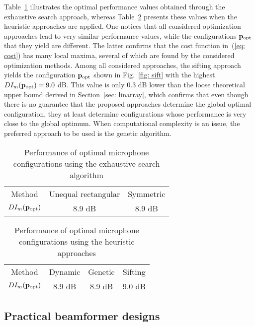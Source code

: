 \documentclass[9pt]{article}
\begin{document}
Table~\ref{tbl: brute} illustrates the optimal performance values obtained through the exhaustive search approach, whereas Table~\ref{tbl: heuristic} presents these values when the heuristic approaches are applied. One notices that all considered optimization approaches lead to very similar performance values, while the configurations $\mathbf{p}_{\rm opt}$ that they yield are different. The latter confirms that the cost function in~(\ref{eq: cost}) has many local maxima, several of which are found by the considered optimization methods.  Among all considered approaches, the sifting approach yields the configuration $\mathbf{p}_{\rm opt}$ shown in Fig.~\ref{fig: sift} with the highest $DI_{m}(\mathbf{p}_{\rm opt}) = 9.0$ dB. This value is only $0.3$ dB lower than the loose theoretical upper bound derived in Section~\ref{sec: linarray}, which confirms that even though there is no guarantee that the proposed approaches determine the global optimal configuration, they at least determine configurations whose performance is very close to the global optimum.  When computational complexity is an issue, the preferred approach to be used is the genetic algorithm. 
\begin{table}[t!]
 \centering
 \small
\caption{Performance of optimal microphone configurations using the exhaustive search algorithm}
\label{tbl: brute}
 \begin{tabular}{c|cc}
\hline
Method & Unequal rectangular  & Symmetric \\
$DI_{m}(\mathbf{p}_{\rm opt})$ & $8.9$ dB  & $8.9$ dB  \\
\hline
\end{tabular}
\end{table}
\vspace{-0.4cm}
\begin{table}[t!]
\small
 \centering
\caption{Performance of optimal microphone configurations using the heuristic approaches}
\label{tbl: heuristic}
 \begin{tabular}{c|ccc}
\hline
Method & Dynamic & Genetic & Sifting \\
$DI_{m}(\mathbf{p}_{\rm opt})$ & $8.9$ dB  & $8.9$ dB  & $9.0$ dB \\
\hline
\end{tabular}
\end{table}

\subsection{Practical beamformer designs}
\label{sec: validation}
\end{document}
